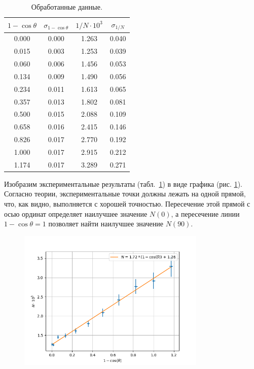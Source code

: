 \documentclass[a4paper, 12pt]{article}
\begin{document}
\begin{table}[H]
    \centering
    \begin{tabular}{|c|c|c|c|}
        \hline
        $1 - \cos \theta$ & $\sigma_{1-\cos \theta}$ & $1/N \cdot 10^3$ & $\sigma_{1/N}$ \\ \hline
        0.000	&	0.000	&	1.263	&	0.040	 \\ \hline
        0.015	&	0.003	&	1.253	&	0.039	 \\ \hline
        0.060	&	0.006	&	1.456	&	0.053	 \\ \hline
        0.134	&	0.009	&	1.490	&	0.056	 \\ \hline
        0.234	&	0.011	&	1.613	&	0.065	 \\ \hline
        0.357	&	0.013	&	1.802	&	0.081	 \\ \hline
        0.500	&	0.015	&	2.088	&	0.109	 \\ \hline
        0.658	&	0.016	&	2.415	&	0.146	 \\ \hline
        0.826	&	0.017	&	2.770	&	0.192	 \\ \hline
        1.000	&	0.017	&	2.915	&	0.212	 \\ \hline
        1.174	&	0.017	&	3.289	&	0.271	 \\ \hline
    \end{tabular}
    \caption{Обработанные данные.}
    \label{table:data}
\end{table}

Изобразим экспериментальные результаты (табл.~\ref{table:data}) в виде графика (рис. \ref{graph:angular}). Согласно теории, экспериментальные точки должны лежать на одной прямой, что, как видно, выполняется с хорошей точностью. Пересечение этой прямой с осью ординат определяет наилучшее значение $N(0)$, а пересечение линии $1 - \cos \theta = 1$ позволяет найти наилучшее значение $N(90)$. 

\begin{figure}[h]
    \centering
    \includegraphics[width=0.8\textwidth]{plot.png}
    \label{graph:angular}
\end{figure}
\end{document}
